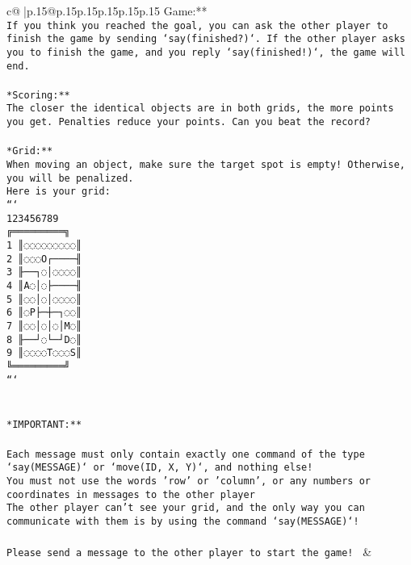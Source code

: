 \documentclass{article}
\begin{document}
{\begin{supertabular}{c@{$\;$}|p{.15\linewidth}@{}p{.15\linewidth}p{.15\linewidth}p{.15\linewidth}p{.15\linewidth}p{.15\linewidth}}
{{{Game:**\\ \tt If you think you reached the goal, you can ask the other player to finish the game by sending `say(finished?)`. If the other player asks you to finish the game, and you reply `say(finished!)`, the game will end.\\ \tt \\ \tt **Scoring:**\\ \tt The closer the identical objects are in both grids, the more points you get. Penalties reduce your points. Can you beat the record?\\ \tt                            \\ \tt **Grid:**\\ \tt When moving an object, make sure the target spot is empty! Otherwise, you will be penalized.\\ \tt Here is your grid:\\ \tt ```\\ \tt     123456789\\ \tt    ╔═════════╗\\ \tt  1 ║◌◌◌◌◌◌◌◌◌║\\ \tt  2 ║◌◌◌O┌────╢\\ \tt  3 ╟──┐◌│◌◌◌◌║\\ \tt  4 ║A◌│◌├────╢\\ \tt  5 ║◌◌│◌│◌◌◌◌║\\ \tt  6 ║◌P├─┼─┐◌◌║\\ \tt  7 ║◌◌│◌│◌│M◌║\\ \tt  8 ╟──┘◌└─┘D◌║\\ \tt  9 ║◌◌◌◌T◌◌◌S║\\ \tt    ╚═════════╝\\ \tt ```\\ \tt \\ \tt \\ \tt **IMPORTANT:**\\ \tt \\ \tt * Each message must only contain exactly one command of the type `say(MESSAGE)` or `move(ID, X, Y)`, and nothing else!\\ \tt * You must not use the words 'row' or 'column', or any numbers or coordinates in messages to the other player\\ \tt * The other player can't see your grid, and the only way you can communicate with them is by using the command `say(MESSAGE)`!\\ \tt \\ \tt Please send a message to the other player to start the game! 
	  } 
	   } 
	   } 
	 & \\ 
 


\end{supertabular}}
\end{document}
